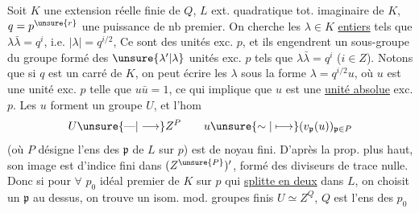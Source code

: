 
Soit $K$ une extension   réelle finie de $Q$, $L$ ext. quadratique tot. imaginaire de $K$, $q=p^{\unsure{r}}$ une puissance de nb premier. On cherche les $\lambda\in K$ \uline{entiers} tels que $\lambda\bar\lambda=q^i$, i.e. $|\lambda|=q^{i/2}$,  Ce sont des unités exc. $p$, et ils engendrent  un sous-groupe du groupe  formé des $\unsure{\lambda'|\lambda}$ unités exc. $p$ tels que $\lambda\bar\lambda=q^i$ ($i\in Z$). Notons que  si $q$ est un carré de $K$, on peut écrire les $\lambda$ sous la forme $\lambda=q^{i/2}u$, où $u$ est une unité exc. $p$ telle que $u\bar u=1$, ce qui implique que $u$ est une \uline{unité absolue} exc. $p$. Les $u$ forment un groupe $U$, et l'hom
\[
U\unsure{\text{—}|\longrightarrow} Z^P\qquad u\unsure{\sim|\longmapsto}(v_{\mathfrak p}(u))_{\mathfrak p\in P}
\]
(où $P$ désigne l'ens des $\mathfrak p$ de $L$ sur $p$) est de noyau fini. D'après la prop. plus haut, son image est  d'indice fini dans $(Z^{\unsure{P}})'$,  formé des diviseurs de trace  nulle. Donc si pour $\forall$ $p_0$  idéal premier de $K$ sur $p$ qui \uline{splitte en deux} dans $L$, on choisit un $\mathfrak p$ au dessus, on trouve un isom. mod. groupes finis $U\simeq Z^Q$, $Q$ est l'ens des $p_0$

